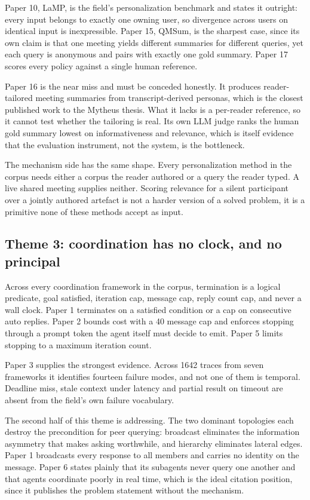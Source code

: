 Paper 10, LaMP, is the field's personalization benchmark and states it
outright: every input belongs to exactly one owning user, so divergence across
users on identical input is inexpressible. Paper 15, QMSum, is the sharpest
case, since its own claim is that one meeting yields different summaries for
different queries, yet each query is anonymous and pairs with exactly one gold
summary. Paper 17 scores every policy against a single human reference.

Paper 16 is the near miss and must be conceded honestly. It produces
reader-tailored meeting summaries from transcript-derived personas, which is
the closest published work to the Mytheus thesis. What it lacks is a per-reader
reference, so it cannot test whether the tailoring is real. Its own LLM judge
ranks the human gold summary lowest on informativeness and relevance, which is
itself evidence that the evaluation instrument, not the system, is the
bottleneck.

The mechanism side has the same shape. Every personalization method in the
corpus needs either a corpus the reader authored or a query the reader typed.
A live shared meeting supplies neither. Scoring relevance for a silent
participant over a jointly authored artefact is not a harder version of a
solved problem, it is a primitive none of these methods accept as input.

\subsection{Theme 3: coordination has no clock, and no principal}

Across every coordination framework in the corpus, termination is a logical
predicate, goal satisfied, iteration cap, message cap, reply count cap, and
never a wall clock. Paper 1 terminates on a satisfied condition or a cap on
consecutive auto replies. Paper 2 bounds cost with a 40 message cap and
enforces stopping through a prompt token the agent itself must decide to emit.
Paper 5 limits stopping to a maximum iteration count.

Paper 3 supplies the strongest evidence. Across 1642 traces from seven
frameworks it identifies fourteen failure modes, and not one of them is
temporal. Deadline miss, stale context under latency and partial result on
timeout are absent from the field's own failure vocabulary.

The second half of this theme is addressing. The two dominant topologies each
destroy the precondition for peer querying: broadcast eliminates the
information asymmetry that makes asking worthwhile, and hierarchy eliminates
lateral edges. Paper 1 broadcasts every response to all members and carries no
identity on the message. Paper 6 states plainly that its subagents never query
one another and that agents coordinate poorly in real time, which is the ideal
citation position, since it publishes the problem statement without the
mechanism.

